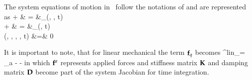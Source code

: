 The system equations of motion in \codeName\ follow the notations of  and are represented as 
\bea \label{eq_system_EOM}
  \Mm \ddot \qv +  \tlambda & = &\fv_\SO(\qv, \dot \qv, t) \\
  \dot \yv +  \tlambda & = &\fv_\FO(\yv, t) \\
  \gv(\qv, \dot \qv, \yv, \tlambda, t) &=& 0
\eea

It is important to note, that for linear mechanical the term $\mathbf{f}_q$ becomes
\be
  \fv^{lin}_\SO = \fv_a - \Km \qv - \Dm \dot \qv
\ee
in which $\mathbf{f}^a$ represents applied forces and stiffness matrix $\mathbf{K}$ and damping matrix $\mathbf{D}$ become part of the system Jacobian for time integration.

